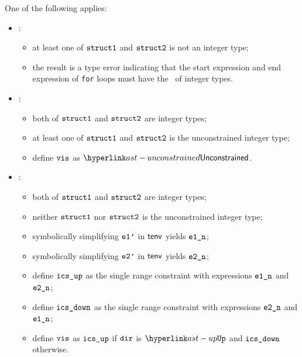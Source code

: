 \ProseParagraph
One of the following applies:
\begin{itemize}
  \item {}:
  \begin{itemize}
    \item at least one of $\structone$ and $\structtwo$ is not an integer type;
    \item the result is a type error indicating that the start expression and end expression of \texttt{for} loops
          must have the \structure\ of integer types.
  \end{itemize}

  \item {}:
  \begin{itemize}
    \item both of $\structone$ and $\structtwo$ are integer types;
    \item at least one of $\structone$ and $\structtwo$ is the unconstrained integer type;
    \item define $\vis$ as $\unconstrained$.
  \end{itemize}

  \item {}:
  \begin{itemize}
    \item both of $\structone$ and $\structtwo$ are integer types;
    \item neither $\structone$ nor $\structtwo$ is the unconstrained integer type;
    \item symbolically simplifying $\veonep$ in $\tenv$ yields $\eonen$\ProseOrTypeError;
    \item symbolically simplifying $\vetwop$ in $\tenv$ yields $\etwon$\ProseOrTypeError;
    \item define $\icsup$ as the single range constraint with expressions $\eonen$ and $\etwon$;
    \item define $\icsdown$ as the single range constraint with expressions $\etwon$ and $\eonen$;
    \item define $\vis$ as $\icsup$ if $\dir$ is $\UP$ and $\icsdown$ otherwise.
  \end{itemize}
\end{itemize}

\FormallyParagraph
\begin{mathpar}
\end{mathpar}

